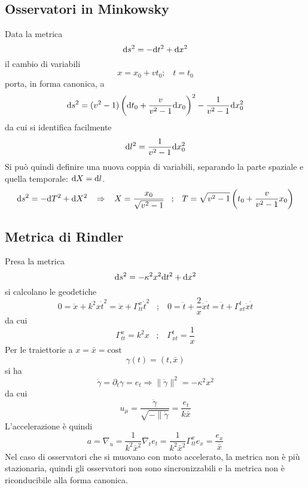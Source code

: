 \subsection{Osservatori in Minkowsky}
Data la metrica 
\[ \mathrm{d} s^2 = -\mathrm{d} t^2 + \mathrm{d} x^2 \]
il cambio di variabili
\[ x = x_0 + vt_0 ; \;\;\; t = t_0 \]
porta, in forma canonica, a 
\[ \mathrm{d} s ^2 = (v^2 -1)\left( \mathrm{d} t_0 + \frac{v}{v^2 -1} \mathrm{d} x_0\right)^2   - \frac{1}{v^2-1} \mathrm{d} x_0^2 \]
da cui si identifica facilmente
\[ \mathrm{d} l^2 = \frac{1}{v^2-1} \mathrm{d} x_0^2 \]
Si pu\`o quindi definire una nuova coppia di variabili, separando la parte spaziale e quella temporale: \( \mathrm{d} X = \mathrm{d} l \).
\[ \mathrm{d} s^2 = -\mathrm{d} T^2 + \mathrm{d} X^2 \;\;\; \Rightarrow \;\;\; X = \frac{x_0}{\sqrt{v^2-1}} \;\;\;;\;\;\; T =\sqrt{v^2 -1}\left( t_0 + \frac{v}{v^2 -1} x_0\right) \]



\subsection{Metrica di Rindler}
Presa la metrica 
\[ \mathrm{d} s^2 = -\kappa^2x^2\mathrm{d} t^2 +\mathrm{d} x^2 \]
si calcolano le geodetiche
\[ 0 = \ddot{x} + k^2x\dot{t}^2 = \ddot{x} + \Gamma^x_{tt} \dot{t}^2 \;\;\; ;\;\;\; 0= \ddot{t} + \frac{2}{x} \dot{x}\dot{t} = \ddot{t} + \Gamma^t_{xt}\dot{x}\dot{t} \]
da cui 
\[ \Gamma^x_{tt} = k^2x \;\;\;;\;\;\;  \Gamma^t_{xt} = \frac{1}{x} \]
Per le traiettorie a \(x=\bar{x}=\mathrm{cost} \)
\[ \gamma(t) = (t,\bar{x}) \]
si ha 
\[ \dot{\gamma} = \partial_t \gamma= e_t \Rightarrow \|\dot{\gamma}\|^2 =-\kappa^2x^2  \]
da cui 
\[ u_\mu = \frac{\dot{\gamma}}{\sqrt{-\|\dot{\gamma}}} = \frac{e_t}{k\bar{x}} \]
L'accelerazione \`e quindi
\[ a = \nabla_ u = \frac{1}{k^2\bar{x}^2} \nabla_t e_t =  \frac{1}{k^2\bar{x}^2} \Gamma_{tt}^x e_x = \frac{e_x}{\bar{x}} \]
Nel caso di osservatori che si muovano con moto accelerato, la metrica non \`e pi\`u stazionaria, quindi gli osservatori non sono sincronizzabili e la metrica non \`e riconducibile alla forma canonica.






